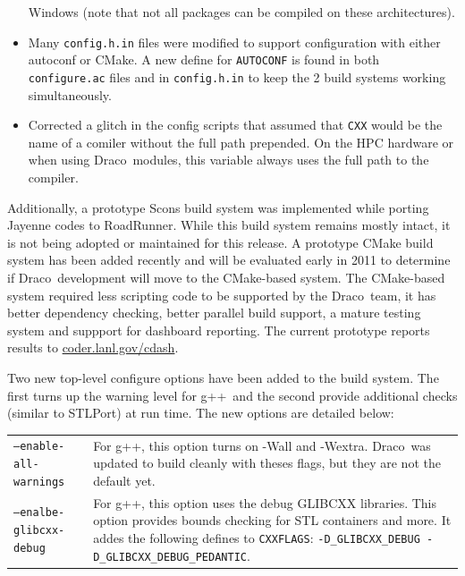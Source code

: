 \documentclass[note]{ResearchNote}
\newcommand{\draco}{Draco}
\newcommand{\gpp}{\textsf{g++}}
\newcommand{\tableText}[1]{{\raggedright #1}}
\begin{document}
\begin{itemize}
  Windows (note that not all packages can be compiled on these
  architectures).
\item Many \texttt{config.h.in} files were modified to support
  configuration with either \textsf{autoconf} or \textsf{CMake}. A new
  define for \texttt{AUTOCONF} is found in both \texttt{configure.ac}
  files and in \texttt{config.h.in} to keep the 2 build systems
  working simultaneously.
\item Corrected a glitch in the config scripts that assumed that
  \texttt{CXX} would be the name of a comiler without the full path
  prepended.  On the HPC hardware or when using \draco\ modules, this
  variable always uses the full path to the compiler.
\end{itemize}

Additionally, a prototype \textsf{Scons} build system was implemented
while porting Jayenne codes to RoadRunner.  While this build system
remains mostly intact, it is not being adopted or maintained for this
release. A prototype \textsf{CMake} build system has been added
recently and will be evaluated early in 2011 to determine if
\draco\ development will move to the CMake-based system.  The
CMake-based system required less scripting code to be supported by the
\draco\ team, it has better dependency checking, better parallel build
support, a mature testing system and suppport for dashboard reporting.
The current prototype reports results to \url{coder.lanl.gov/cdash}.

Two new top-level configure options have been added to the build
system.  The first turns up the warning level for \gpp\ and the second
provide additional checks (similar to STLPort) at run time.  The new
options are detailed below:
%
\begin{center}
  \footnotesize
  \begin{tabular}{lp{4.0in}}
    \hline\hline
\texttt{--enable-all-warnings} & 
     \tableText{For g++, this option turns on -Wall and -Wextra.
       \draco\ was updated to build cleanly with theses flags, but
       they are not the default yet.} \\ 
\texttt{--enalbe-glibcxx-debug} &
     \tableText{For g++, this option uses the debug GLIBCXX
       libraries.  This option provides bounds checking for STL
       containers and more.  It addes the following defines to
       \texttt{CXXFLAGS}: \texttt{-D\_GLIBCXX\_DEBUG
         -D\_GLIBCXX\_DEBUG\_PEDANTIC}. } \\
    \hline\hline
  \end{tabular}
\end{center}
\end{document}
